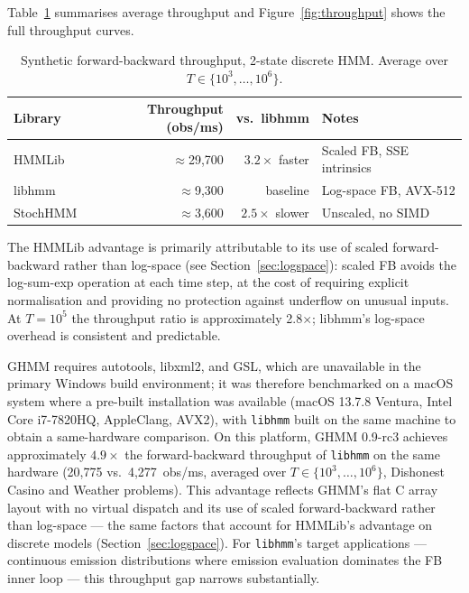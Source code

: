 \documentclass[11pt]{article}
\begin{document}
Table~\ref{tab:synthetic} summarises average throughput and
Figure~\ref{fig:throughput} shows the full throughput curves.

\begin{table}[!ht]
\centering
\caption{Synthetic forward-backward throughput, 2-state discrete HMM.
Average over $T \in \{10^3, \ldots, 10^6\}$.}
\label{tab:synthetic}
\begin{tabular}{lrrl}
\toprule
Library & Throughput (obs/ms) & vs.\ libhmm & Notes \\
\midrule
HMMLib   & $\approx$29,700 & $\mathbf{3.2\times}$ faster & Scaled FB, SSE intrinsics \\
libhmm   & $\approx$9,300  & baseline              & Log-space FB, AVX-512 \\
StochHMM & $\approx$3,600  & $2.5\times$ slower    & Unscaled, no SIMD \\
\bottomrule
\end{tabular}
\end{table}

The HMMLib advantage is primarily attributable to its use of scaled
forward-backward rather than log-space (see Section~\ref{sec:logspace}):
scaled FB avoids the log-sum-exp operation at each time step, at the
cost of requiring explicit normalisation and providing no protection
against underflow on unusual inputs.
At $T = 10^5$ the throughput ratio is approximately 2.8$\times$;
libhmm's log-space overhead is consistent and predictable.

GHMM requires autotools, libxml2, and GSL, which are unavailable in
the primary Windows build environment; it was therefore benchmarked on
a macOS system where a pre-built installation was available (macOS
13.7.8 Ventura, Intel Core i7-7820HQ, AppleClang, AVX2), with
\texttt{libhmm} built on the same machine to obtain a same-hardware
comparison.
On this platform, GHMM 0.9-rc3 achieves approximately $4.9\times$ the
forward-backward throughput of \texttt{libhmm} on the same hardware
(20,775 vs.\ 4,277~obs/ms, averaged over $T \in \{10^3, \ldots, 10^6\}$,
Dishonest Casino and Weather problems).
This advantage reflects GHMM's flat C array layout with no virtual
dispatch and its use of scaled forward-backward rather than log-space ---
the same factors that account for HMMLib's advantage on discrete models
(Section~\ref{sec:logspace}).
For \texttt{libhmm}'s target applications --- continuous emission
distributions where emission evaluation dominates the FB inner loop ---
this throughput gap narrows substantially.
\end{document}
